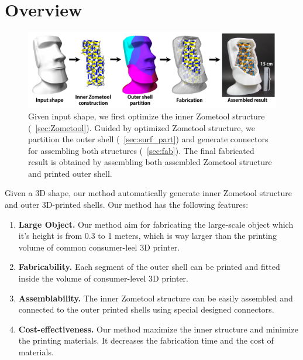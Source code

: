 \section{Overview}
\label{sec:overview}

\begin{figure}[h]
\centering
\includegraphics[width=1.0\linewidth]{figs/pipeline2.pdf} 
\caption{
Given input shape, we first optimize the inner Zometool structure (\secname~\ref{sec:Zometool}). Guided by optimized Zometool structure, we partition the outer shell (\secname~\ref{sec:surf_part}) and generate connectors for assembling both structures (\secname~\ref{sec:fab}).
The final fabricated result is obtained by assembling both assembled Zometool structure and printed outer shell.
}
\label{fig:result-pipeline}
\end{figure}

Given a 3D shape, our method automatically generate inner Zometool structure and outer 3D-printed shells.
Our method has the following features:
\begin{enumerate}
\item \textbf{Large Object.} Our method aim for fabricating the large-scale object which it's height is from 0.3 to 1 meters, which is way larger than the printing volume of common consumer-leel 3{D} printer.
\item \textbf{Fabricability.} Each segment of the outer shell can be printed and fitted inside the volume of consumer-level 3{D} printer.
\item \textbf{Assemblability.} The inner Zometool structure can be easily assembled and connected to the outer printed shells using special designed connectors.
\item \textbf{Cost-effectiveness.} Our method maximize the inner structure and minimize the printing materials. 
It decreases the fabrication time and the cost of materials.
\end{enumerate}

